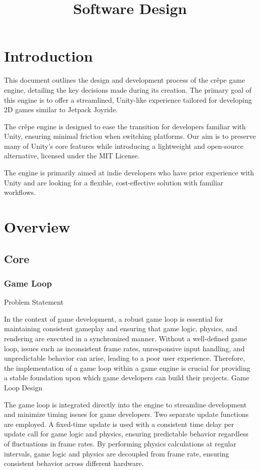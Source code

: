 \documentclass{projdoc}
\title{Software Design}
\begin{document}
\tablestables
\newpage

\section{Introduction}

This document outlines the design and development process of the cr\^epe game engine,
detailing the key decisions made during its creation. The primary goal of this engine
is to offer a streamlined, Unity-like experience tailored for developing 2D games
similar to Jetpack Joyride.

The cr\^epe engine is designed to ease the transition for developers familiar with
Unity, ensuring minimal friction when switching platforms. Our aim is to preserve
many of Unity’s core features while introducing a lightweight and open-source
alternative, licensed under the MIT License.

The engine is primarily aimed at indie developers who have prior experience with
Unity and are looking for a flexible, cost-effective solution with familiar
workflows.

\section{Overview}

\subsection{Core}
\subsubsection{Game Loop}
Problem Statement\

In the context of game development, a robust game loop is essential for maintaining consistent gameplay and ensuring that game logic, physics, and rendering are executed in a synchronized manner. Without a well-defined game loop, issues such as inconsistent frame rates, unresponsive input handling, and unpredictable behavior can arise, leading to a poor user experience. Therefore, the implementation of a game loop within a game engine is crucial for providing a stable foundation upon which game developers can build their projects.
Game Loop Design\

The game loop is integrated directly into the engine to streamline development and minimize timing issues for game developers. Two separate update functions are employed. A fixed-time update is used with a consistent time delay per update call for game logic and physics, ensuring predictable behavior regardless of fluctuations in frame rates. By performing physics calculations at regular intervals, game logic and physics are decoupled from frame rate, ensuring consistent behavior across different hardware.
\end{document}

